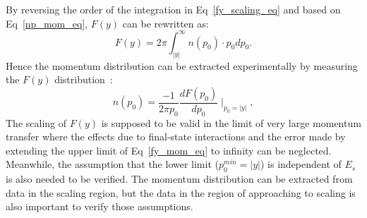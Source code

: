 By reversing the order of the integration in Eq~\ref{fy_scaling_eq} and based on Eq~\eqref{np_mom_eq}, $F(y)$ can be rewritten as:
\begin{equation}
  F(y) = 2\pi\int_{|y|}^{\infty}n(p_{0})\cdot p_{0}dp_{0}.
  \label{fy_mom_eq}
\end{equation} 
Hence the momentum distribution can be extracted experimentally by measuring the $F(y)$ distribution~\cite{qe_donal}:
\begin{equation}
  n(p_{0}) = \frac{-1}{2\pi p_{0}}\frac{dF(p_{0})}{dp_{0}} \mid_{p_{0}=|y|},
  \label{mom_dis_fy}
\end{equation}
The scaling of $F(y)$ is supposed to be valid in the limit of very large momentum transfer where the effects due to final-state interactions and the error made by extending the upper limit of Eq~\eqref{fy_mom_eq} to infinity can be neglected. Meanwhile, the assumption that the lower limit ($p_{0}^{min}=|y|$) is independent of $E_{s}$ is also needed to be verified. The momentum distribution can be extracted from data in the scaling region, but the data in the region of approaching to scaling is also important to verify those assumptions.
